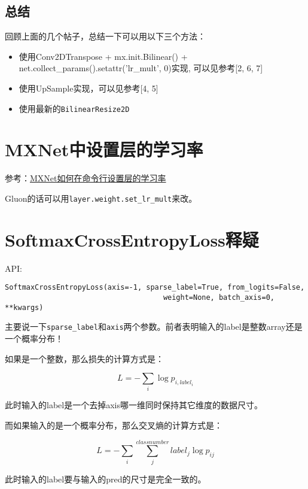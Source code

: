 \subsection{总结}

回顾上面的几个帖子，总结一下可以用以下三个方法：
\begin{itemize}
\item 使用Conv2DTranspose + mx.init.Bilinear() + net.collect\_params().setattr('lr\_mult', 0)实现, 可以见参考[2, 6, 7]
\item 使用UpSample实现，可以见参考[4, 5]
\item 使用最新的\verb|BilinearResize2D|
\end{itemize}


\section{MXNet中设置层的学习率}

参考：\href{https://discuss.gluon.ai/t/topic/6636}{MXNet如何在命令行设置层的学习率}

Gluon的话可以用\verb|layer.weight.set_lr_mult|来改。

\section{SoftmaxCrossEntropyLoss释疑}

API:

\begin{verbatim}
SoftmaxCrossEntropyLoss(axis=-1, sparse_label=True, from_logits=False, 
									 weight=None, batch_axis=0, **kwargs)
\end{verbatim}

主要说一下\verb|sparse_label|和\verb|axis|两个参数。前者表明输入的label是整数array还是一个概率分布！

如果是一个整数，那么损失的计算方式是：

\begin{displaymath}
L = - \sum_{i}\log p_{i, label_i}
\end{displaymath}

此时输入的label是一个去掉axis哪一维同时保持其它维度的数据尺寸。

而如果输入的是一个概率分布，那么交叉熵的计算方式是：

\begin{displaymath}
L = - \sum_{i} \sum_{j}^{class number} label_j \log p_{ij}
\end{displaymath}

此时输入的label要与输入的pred的尺寸是完全一致的。

